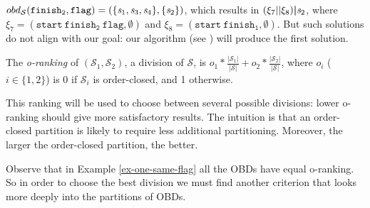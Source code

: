 \noindent
${obd}_{\mathcal{S}}(\mathtt{finish_2},\mathtt{flag})=(\{\mathit{s}_1,\mathit{s}_3,\mathit{s}_4\},\{\mathit{s}_2\})$,
which results in $(\xi_7||\xi_8)\boldsymbol{|}\mathit{s}_2$,
where
$\xi_7=(\mathtt{start}~ \mathtt{finish_2}~ \mathtt{flag},\emptyset)$
and
$\xi_8=(\mathtt{start}~ \mathtt{finish_1},\emptyset)$.
But
such solutions do not align with our goal: our algorithm (see
)
will produce the first solution.
\begin{definition}
\label{o-ranking}
The \emph{o-ranking} of $(\mathcal{S}_1,\mathcal{S}_2)$,  a division
of $\mathcal{S}$, is
$o_1*\frac{|\mathcal{S}_1|}{|\mathcal{S}|}+o_2*\frac{|\mathcal{S}_2|}{|\mathcal{S}|}$,
where $o_i$ ($i\in\{1,2\}$) is
0 if $\mathcal{S}_i$ is order-closed, and 1 otherwise.
\end{definition}
\noindent
This ranking will be used to choose between several possible
divisions: lower o-ranking should give more satisfactory results.
The intuition is that an order-closed partition is
likely to require less additional partitioning.
Moreover, the larger the order-closed partition, the better.

Observe that in Example \ref{ex-one-same-flag} all the OBDs have equal
o-ranking.
So in order to choose the best
division we must find another criterion that looks more deeply into
the partitions of OBDs.

